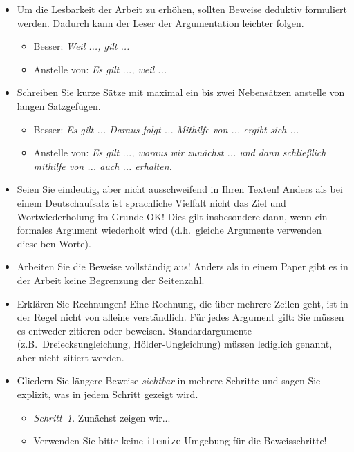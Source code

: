 \documentclass[../main.tex]{subfiles}
\begin{document}
\begin{itemize}

  \item Um die Lesbarkeit der Arbeit zu erhöhen, sollten Beweise deduktiv formuliert werden. Dadurch kann der Leser der Argumentation leichter folgen.
        \begin{itemize}
          \item Besser: \emph{Weil ..., gilt ...}
          \item Anstelle von: \emph{Es gilt ..., weil ...}
        \end{itemize}

  \item Schreiben Sie kurze Sätze mit maximal ein bis zwei Nebensätzen anstelle von langen Satzgefügen.
        \begin{itemize}
          \item Besser: \emph{Es gilt ... Daraus folgt ... Mithilfe von ... ergibt sich ...}
          \item Anstelle von: \emph{Es gilt ..., woraus wir zunächst ... und dann schließlich mithilfe von ... auch ... erhalten.}
        \end{itemize}

  \item Seien Sie eindeutig, aber nicht ausschweifend in Ihren Texten! Anders als bei einem Deutschaufsatz ist sprachliche Vielfalt nicht das Ziel und Wortwiederholung im Grunde OK! Dies gilt insbesondere dann, wenn ein formales Argument wiederholt wird (d.h.\ gleiche Argumente verwenden dieselben Worte).

  \item Arbeiten Sie die Beweise vollständig aus! Anders als in einem Paper gibt es in der Arbeit keine Begrenzung der Seitenzahl.

  \item Erklären Sie Rechnungen! Eine Rechnung, die über mehrere Zeilen geht, ist in der Regel nicht von alleine verständlich. Für jedes Argument gilt: Sie müssen es entweder zitieren oder beweisen. Standardargumente (z.B.\ Dreiecksungleichung, H\"older-Ungleichung) müssen lediglich genannt, aber nicht zitiert werden.

  \item Gliedern Sie längere Beweise \emph{sichtbar} in mehrere Schritte und sagen Sie explizit, was in jedem Schritt gezeigt wird.
        \begin{itemize}
          \item \emph{Schritt~1.} Zunächst zeigen wir...
          \item Verwenden Sie bitte keine \verb$itemize$-Umgebung für die Beweisschritte!
        \end{itemize}


\end{itemize}
\end{document}
